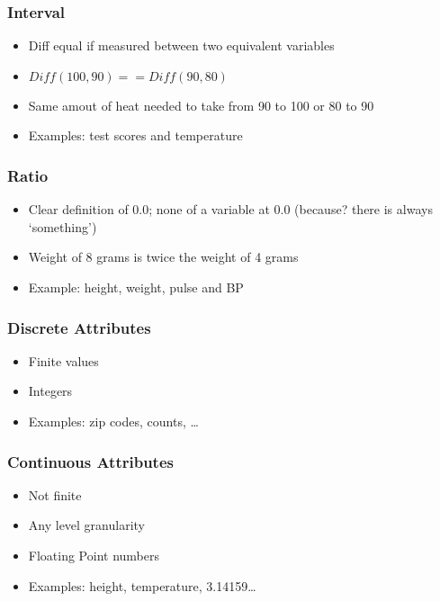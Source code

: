 \begin{frame}[fragile]\frametitle{Interval}	

	\begin{itemize}
	\item Diff equal if measured between two equivalent variables
	\item $Diff(100,90) == Diff(90,80)$
	\item Same amout of heat needed to take from 90 to 100 or 80 to 90
	\item Examples: test scores and temperature
	\end{itemize}

\end{frame}


\begin{frame}[fragile]\frametitle{Ratio}	

	\begin{itemize}
	\item Clear definition of 0.0; none of a variable at 0.0 (because? there is always `something')
	\item Weight of 8 grams is twice the weight of 4 grams
	\item Example: height, weight, pulse and BP
	\end{itemize}	

\end{frame}


\begin{frame}[fragile] \frametitle{Discrete Attributes}
\begin{itemize}
\item Finite values
\item Integers
\item Examples: zip codes, counts, \ldots
\end{itemize}
\end{frame}


\begin{frame}[fragile] \frametitle{Continuous Attributes}
\begin{itemize}
\item Not finite
\item Any level granularity
\item Floating Point numbers
\item Examples: height, temperature, 3.14159\ldots
\end{itemize}

\end{frame}

